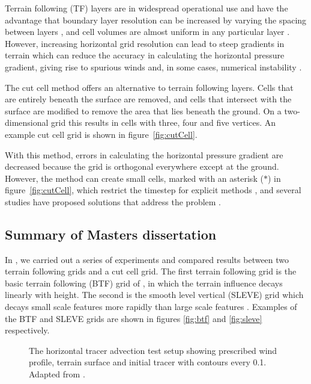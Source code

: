 \documentclass[a4paper]{article}
\begin{document}
Terrain following (TF) layers are in widespread operational use and have the advantage that boundary layer resolution can be increased by varying the spacing between layers \citep{schaer2002}, and cell volumes are almost uniform in any particular layer \citep{jebens2011}.  However, increasing horizontal grid resolution can lead to steep gradients in terrain which can reduce the accuracy in calculating the horizontal pressure gradient, giving rise to spurious winds and, in some cases, numerical instability \citep{klemp2011,webster2003}.

The cut cell method offers an alternative to terrain following layers.  Cells that are entirely beneath the surface are removed, and cells that intersect with the surface are modified to remove the area that lies beneath the ground.  On a two-dimensional grid this results in cells with three, four and five vertices.  An example cut cell grid is shown in figure~\ref{fig:cutCell}.

With this method, errors in calculating the horizontal pressure gradient are decreased because the grid is orthogonal everywhere except at the ground.  However, the method can create small cells, marked with an asterisk ($\ast$) in figure~\ref{fig:cutCell}, which restrict the timestep for explicit methods \citep{jebens2011}, and several studies have proposed solutions that address the problem \citep{steppeler2002,yamazaki-satomura2010,jebens2011}.

\subsection{Summary of Masters dissertation}
In \citet{shaw2014}, we carried out a series of experiments and compared results between two terrain following grids and a cut cell grid.  The first terrain following grid is the basic terrain following (BTF) grid of \citet{galchen-somerville1975}, in which the terrain influence decays linearly with height.  The second is the smooth level vertical (SLEVE) grid which decays small scale features more rapidly than large scale features \citep{schaer2002,leuenberger2010}.  Examples of the BTF and SLEVE grids are shown in figures \ref{fig:btf} and \ref{fig:sleve} respectively.

\begin{figure}
	\centering
	
%
	\caption{The horizontal tracer advection test setup showing prescribed wind profile, terrain surface and initial tracer with contours every 0.1.  Adapted from \citet{schaer2002}.}
	\label{fig:advection-initial-conditions}
\end{figure}
\end{document}
